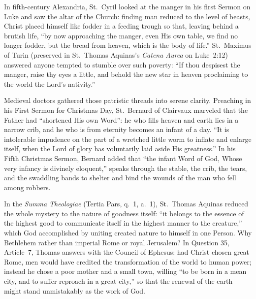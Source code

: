 In fifth-century Alexandria, St.~Cyril looked at the manger in his first Sermon
on Luke and saw the altar of the Church: finding man reduced to the level of
beasts, Christ placed himself like fodder in a feeding trough so that, leaving
behind a brutish life, ``by now approaching the manger, even His own table, we
find no longer fodder, but the bread from heaven, which is the body of life.''
St.~Maximus of Turin (preserved in St.~Thomas Aquinas's \textit{Catena Aurea} on
Luke~2:12) answered anyone tempted to stumble over such poverty: ``If thou
despisest the manger, raise thy eyes a little, and behold the new star in heaven
proclaiming to the world the Lord's nativity.''

Medieval doctors gathered those patristic threads into serene clarity.
Preaching in his First Sermon for Christmas Day, St.~Bernard of Clairvaux
marveled that the Father had ``shortened His own Word'': he who fills heaven and
earth lies in a narrow crib, and he who is from eternity becomes an infant of a
day. ``It is intolerable impudence on the part of a wretched little worm to
inflate and enlarge itself, when the Lord of glory has voluntarily laid aside
His greatness.'' In his Fifth Christmas Sermon, Bernard added that ``the infant
Word of God, Whose very infancy is divinely eloquent,'' speaks through the
stable, the crib, the tears, and the swaddling bands to shelter and bind the
wounds of the man who fell among robbers.

In the \textit{Summa Theologiae} (Tertia Pars, q.~1, a.~1), St.~Thomas Aquinas
reduced the whole mystery to the nature of goodness itself: ``it belongs to the
essence of the highest good to communicate itself in the highest manner to the
creature,'' which God accomplished by uniting created nature to himself in one
Person. Why Bethlehem rather than imperial Rome or royal Jerusalem? In Question
35, Article~7, Thomas answers with the Council of Ephesus: had Christ chosen
great Rome, men would have credited the transformation of the world to human
power; instead he chose a poor mother and a small town, willing ``to be born in
a mean city, and to suffer reproach in a great city,'' so that the renewal of
the earth might stand unmistakably as the work of God.

